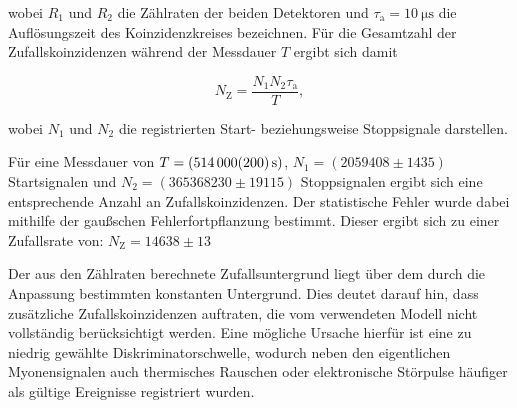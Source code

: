 wobei \(R_1\) und \(R_2\) die Zählraten der beiden Detektoren und \(\tau_\mathrm{a}=\SI{10}{\micro\second}\) die Auflösungszeit des Koinzidenzkreises bezeichnen. Für die Gesamtzahl der Zufallskoinzidenzen während der Messdauer \(T\) ergibt sich damit

\begin{equation}
N_\mathrm{Z}
=
\frac{N_1N_2\tau_\mathrm{a}}{T},
\end{equation}

wobei \(N_1\) und \(N_2\) die registrierten Start- beziehungsweise Stoppsignale darstellen.

Für eine Messdauer von \(T=(\SI{514000 \pm 200}{\second})\), \(N_1=(2059408 \pm 1435)\) Startsignalen und \(N_2=(365368230 \pm 19115)\) Stoppsignalen ergibt sich eine entsprechende Anzahl an Zufallskoinzidenzen. Der statistische Fehler wurde dabei mithilfe der gaußschen Fehlerfortpflanzung bestimmt.
Dieser ergibt sich zu einer Zufallsrate von: \(N_\mathrm{Z} = 14638 \pm 13\)

Der aus den Zählraten berechnete Zufallsuntergrund liegt über dem durch die Anpassung bestimmten konstanten Untergrund. Dies deutet darauf hin, dass zusätzliche Zufallskoinzidenzen auftraten, die vom verwendeten Modell nicht vollständig berücksichtigt werden. Eine mögliche Ursache hierfür ist eine zu niedrig gewählte Diskriminatorschwelle, wodurch neben den eigentlichen Myonensignalen auch thermisches Rauschen oder elektronische Störpulse häufiger als gültige Ereignisse registriert wurden. 
